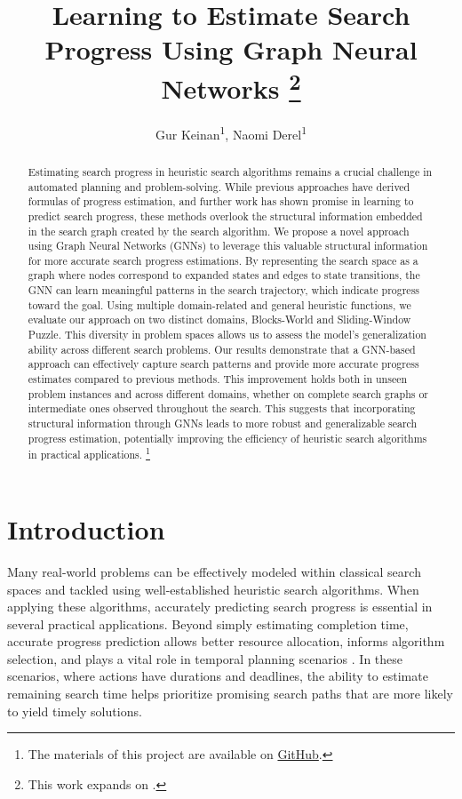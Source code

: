 \documentclass[letterpaper]{article}
\title{Learning to Estimate Search Progress Using Graph Neural Networks \thanks{This work expands on \citet{sudry2022learning}.}}
\author{
    Gur Keinan\textsuperscript{\rm 1},
    Naomi Derel\textsuperscript{\rm 1}
}
\begin{document}
\maketitle

\begin{abstract}
    Estimating search progress in heuristic search algorithms remains a crucial challenge in automated planning and problem-solving. While previous approaches have derived formulas of progress estimation, and further work has shown promise in learning to predict search progress, these methods overlook the structural information embedded in the search graph created by the search algorithm.
    We propose a novel approach using Graph Neural Networks (GNNs) to leverage this valuable structural information for more accurate search progress estimations. By representing the search space as a graph where nodes correspond to expanded states and edges to state transitions, the GNN can learn meaningful patterns in the search trajectory, which indicate progress toward the goal.
    Using multiple domain-related and general heuristic functions, we evaluate our approach on two distinct domains, Blocks-World and Sliding-Window Puzzle. This diversity in problem spaces allows us to assess the model's generalization ability across different search problems.
    Our results demonstrate that a GNN-based approach can effectively capture search patterns and provide more accurate progress estimates compared to previous methods. This improvement holds both in unseen problem instances and across different domains, whether on complete search graphs or intermediate ones observed throughout the search.
    This suggests that incorporating structural information through GNNs leads to more robust and generalizable search progress estimation, potentially improving the efficiency of heuristic search algorithms in practical applications.
\footnote{The materials of this project are available on \href{https://github.com/GurKeinan/Artificial-Intelligence-and-Autonomous-Systems}{GitHub}.}
\end{abstract}

\section{Introduction}

Many real-world problems can be effectively modeled within classical search spaces and tackled using well-established heuristic search algorithms. When applying these algorithms, accurately predicting search progress is essential in several practical applications. Beyond simply estimating completion time, accurate progress prediction allows better resource allocation, informs algorithm selection, and plays a vital role in temporal planning scenarios \citep{cashmore2018temporal}. In these scenarios, where actions have durations and deadlines, the ability to estimate remaining search time helps prioritize promising search paths that are more likely to yield timely solutions.
\end{document}
